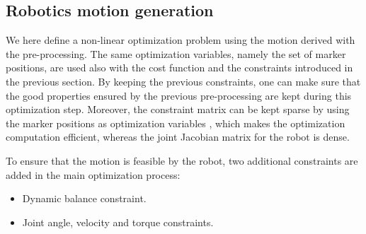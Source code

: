 \documentclass[letterpaper, 10 pt, conference]{ieeeconf}  %
\begin{document}



\subsection{Robotics motion generation}


We here define a non-linear optimization problem using the motion
derived with the pre-processing. 
The same optimization variables, namely the set of marker positions,
are used also with the cost function and the constraints introduced in
the previous section.
By keeping the previous constraints, one can make sure that the good
properties ensured by the previous pre-processing are kept during this
optimization step.
Moreover, the constraint matrix can be kept sparse by 
using the marker positions as optimization variables 
\cite{Komura10}, which makes the optimization computation efficient,
whereas the joint Jacobian matrix for the robot is dense.

To ensure that the motion is feasible by the robot, two
additional constraints are added in the main optimization process:
\begin{itemize}
\item Dynamic balance constraint.
\item Joint angle, velocity and torque constraints.
\end{itemize}
\end{document}
